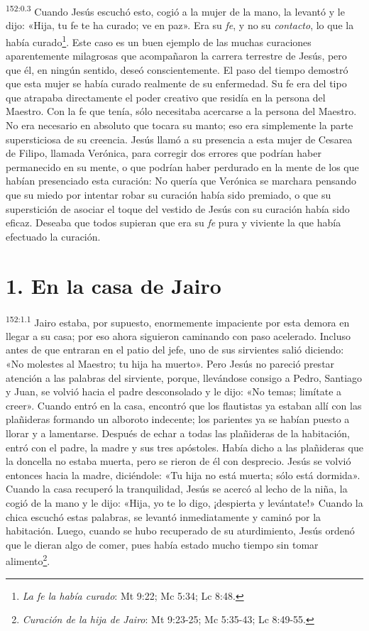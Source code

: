 \par 
\textsuperscript{152:0.3} Cuando Jesús escuchó esto, cogió a la mujer de la mano, la levantó y le dijo: «Hija, tu fe te ha curado; ve en paz». Era su \textit{fe}, y no su \textit{contacto}, lo que la había curado\footnote{\textit{La fe la había curado}: Mt 9:22; Mc 5:34; Lc 8:48.}. Este caso es un buen ejemplo de las muchas curaciones aparentemente milagrosas que acompañaron la carrera terrestre de Jesús, pero que él, en ningún sentido, deseó conscientemente. El paso del tiempo demostró que esta mujer se había curado realmente de su enfermedad. Su fe era del tipo que atrapaba directamente el poder creativo que residía en la persona del Maestro. Con la fe que tenía, sólo necesitaba acercarse a la persona del Maestro. No era necesario en absoluto que tocara su manto; eso era simplemente la parte supersticiosa de su creencia. Jesús llamó a su presencia a esta mujer de Cesarea de Filipo, llamada Verónica, para corregir dos errores que podrían haber permanecido en su mente, o que podrían haber perdurado en la mente de los que habían presenciado esta curación: No quería que Verónica se marchara pensando que su miedo por intentar robar su curación había sido premiado, o que su superstición de asociar el toque del vestido de Jesús con su curación había sido eficaz. Deseaba que todos supieran que era su \textit{fe} pura y viviente la que había efectuado la curación.

\section*{1. En la casa de Jairo}
\par 
\textsuperscript{152:1.1} Jairo estaba, por supuesto, enormemente impaciente por esta demora en llegar a su casa; por eso ahora siguieron caminando con paso acelerado. Incluso antes de que entraran en el patio del jefe, uno de sus sirvientes salió diciendo: «No molestes al Maestro; tu hija ha muerto». Pero Jesús no pareció prestar atención a las palabras del sirviente, porque, llevándose consigo a Pedro, Santiago y Juan, se volvió hacia el padre desconsolado y le dijo: «No temas; limítate a creer». Cuando entró en la casa, encontró que los flautistas ya estaban allí con las plañideras formando un alboroto indecente; los parientes ya se habían puesto a llorar y a lamentarse. Después de echar a todas las plañideras de la habitación, entró con el padre, la madre y sus tres apóstoles. Había dicho a las plañideras que la doncella no estaba muerta, pero se rieron de él con desprecio. Jesús se volvió entonces hacia la madre, diciéndole: «Tu hija no está muerta; sólo está dormida». Cuando la casa recuperó la tranquilidad, Jesús se acercó al lecho de la niña, la cogió de la mano y le dijo: «Hija, yo te lo digo, ¡despierta y levántate!» Cuando la chica escuchó estas palabras, se levantó inmediatamente y caminó por la habitación. Luego, cuando se hubo recuperado de su aturdimiento, Jesús ordenó que le dieran algo de comer, pues había estado mucho tiempo sin tomar alimento\footnote{\textit{Curación de la hija de Jairo}: Mt 9:23-25; Mc 5:35-43; Lc 8:49-55.}.

